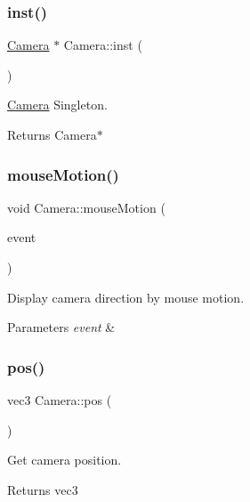 \subsubsection{\texorpdfstring{inst()}{inst()}}
{\footnotesize\ttfamily \mbox{\hyperlink{classCamera}{Camera}} $\ast$ Camera\+::inst (\begin{DoxyParamCaption}{ }\end{DoxyParamCaption})\hspace{0.3cm}{\ttfamily [static]}}



\mbox{\hyperlink{classCamera}{Camera}} Singleton. 

\begin{DoxyReturn}{Returns}
Camera$\ast$ 
\end{DoxyReturn}
\mbox{\label{classCamera_a32764e00a0e9359a546e7b68cdaa6aa1}} 
\subsubsection{\texorpdfstring{mouseMotion()}{mouseMotion()}}
{\footnotesize\ttfamily void Camera\+::mouse\+Motion (\begin{DoxyParamCaption}\item[{S\+D\+L\+\_\+\+Event \&}]{event }\end{DoxyParamCaption})}



Display camera direction by mouse motion. 


\begin{DoxyParams}{Parameters}
{\em event} & \\
\hline
\end{DoxyParams}
\mbox{\label{classCamera_ac28fec027fd3779e273a5bbd9439bfb5}} 
\subsubsection{\texorpdfstring{pos()}{pos()}}
{\footnotesize\ttfamily vec3 Camera\+::pos (\begin{DoxyParamCaption}{ }\end{DoxyParamCaption})}



Get camera position. 

\begin{DoxyReturn}{Returns}
vec3 
\end{DoxyReturn}
\mbox{\label{classCamera_a59690505905b7a1446e4e8de09f00916}} 
